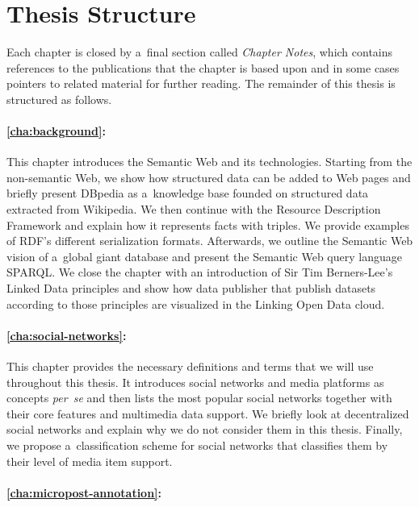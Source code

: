 \section{Thesis Structure}

Each chapter is closed by a~final section called
\emph{Chapter Notes}, which contains references to the publications
that the chapter is based upon
and in some cases pointers to related material for further reading.
The remainder of this thesis is structured as follows. 

\paragraph{\autoref{cha:background}:}

This chapter introduces the Semantic Web and its technologies.
Starting from the non-semantic Web,
we show how structured data can be added to Web pages
and briefly present DBpedia as a~knowledge base
founded on structured data extracted from Wikipedia.
We then continue with the Resource Description Framework
and explain how it represents facts with triples.
We provide examples of RDF's different serialization formats.
Afterwards, we outline the Semantic Web vision of
a~global giant database and present the Semantic Web
query language SPARQL.
We close the chapter with an introduction of Sir Tim Berners-Lee's
Linked Data principles and show how data publisher that publish
datasets according to those principles are visualized in the
Linking Open Data cloud.

\paragraph{\autoref{cha:social-networks}:}

This chapter provides the necessary definitions and terms
that we will use throughout this thesis. 
It introduces social networks and media platforms as concepts
\emph{per~se} and then lists the most popular social networks
together with their core features and multimedia data support.
We briefly look at decentralized social networks and explain
why we do not consider them in this thesis.
Finally, we propose a~classification scheme for social networks
that classifies them by their level of media item support.

\paragraph{\autoref{cha:micropost-annotation}:}

